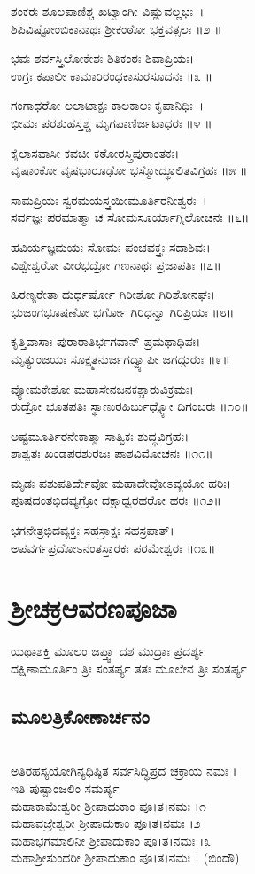 ಶಂಕರಃ ಶೂಲಪಾಣಿಶ್ಚ ಖಟ್ವಾಂಗೀ ವಿಷ್ಣುವಲ್ಲಭಃ~।\\
ಶಿಪಿವಿಷ್ಟೋಂಬಿಕಾನಾಥಃ ಶ್ರೀಕಂಠೋ ಭಕ್ತವತ್ಸಲಃ ॥೨ ॥

ಭವಃ ಶರ್ವಸ್ತ್ರಿಲೋಕೇಶಃ ಶಿತಿಕಂಠಃ ಶಿವಾಪ್ರಿಯಃ।\\
ಉಗ್ರಃ ಕಪಾಲೀ ಕಾಮಾರಿರಂಧಕಾಸುರಸೂದನಃ ॥೩ ॥

ಗಂಗಾಧರೋ ಲಲಾಟಾಕ್ಷಃ ಕಾಲಕಾಲಃ ಕೃಪಾನಿಧಿಃ~।\\
ಭೀಮಃ ಪರಶುಹಸ್ತಶ್ಚ ಮೃಗಪಾಣಿರ್ಜಟಾಧರಃ ॥೪ ॥

ಕೈಲಾಸವಾಸೀ ಕವಚೀ ಕಠೋರಸ್ತ್ರಿಪುರಾಂತಕಃ।\\
ವೃಷಾಂಕೋ ವೃಷಭಾರೂಢೋ ಭಸ್ಮೋದ್ಧೂಲಿತವಿಗ್ರಹಃ ॥೫ ॥

ಸಾಮಪ್ರಿಯಃ ಸ್ವರಮಯಸ್ತ್ರಯೀಮೂರ್ತಿರನೀಶ್ವರಃ~।\\
ಸರ್ವಜ್ಞಃ ಪರಮಾತ್ಮಾ ಚ ಸೋಮಸೂರ್ಯಾಗ್ನಿಲೋಚನಃ ॥೬॥

ಹವಿರ್ಯಜ್ಞಮಯಃ ಸೋಮಃ ಪಂಚವಕ್ತ್ರಃ ಸದಾಶಿವಃ।\\
ವಿಶ್ವೇಶ್ವರೋ ವೀರಭದ್ರೋ ಗಣನಾಥಃ ಪ್ರಜಾಪತಿಃ ॥೭॥

ಹಿರಣ್ಯರೇತಾ ದುರ್ಧರ್ಷೋ ಗಿರೀಶೋ ಗಿರಿಶೋನಘಃ।\\
ಭುಜಂಗಭೂಷಣೋ ಭರ್ಗೋ ಗಿರಿಧನ್ವಾ ಗಿರಿಪ್ರಿಯಃ ॥೮॥

ಕೃತ್ತಿವಾಸಾಃ ಪುರಾರಾತಿರ್ಭಗವಾನ್ ಪ್ರಮಥಾಧಿಪಃ।\\
ಮೃತ್ಯುಂಜಯಃ ಸೂಕ್ಷ್ಮತನುರ್ಜಗದ್ವ್ಯಾಪೀ ಜಗದ್ಗುರುಃ ॥೯॥

ವ್ಯೋಮಕೇಶೋ ಮಹಾಸೇನಜನಕಶ್ಚಾರುವಿಕ್ರಮಃ।\\
ರುದ್ರೋ ಭೂತಪತಿಃ ಸ್ಥಾಣುರಹಿರ್ಬುಧ್ನ್ಯೋ ದಿಗಂಬರಃ ॥೧೦॥

ಅಷ್ಟಮೂರ್ತಿರನೇಕಾತ್ಮಾ ಸಾತ್ವಿಕಃ ಶುದ್ಧವಿಗ್ರಹಃ।\\
ಶಾಶ್ವತಃ ಖಂಡಪರಶುರಜಃ ಪಾಶವಿಮೋಚನಃ ॥೧೧॥

ಮೃಡಃ ಪಶುಪತಿರ್ದೇವೋ ಮಹಾದೇವೋಽವ್ಯಯೋ ಹರಿಃ।\\
ಪೂಷದಂತಭಿದವ್ಯಗ್ರೋ ದಕ್ಷಾಧ್ವರಹರೋ ಹರಃ ॥೧೨॥

ಭಗನೇತ್ರಭಿದವ್ಯಕ್ತಃ ಸಹಸ್ರಾಕ್ಷಃ ಸಹಸ್ರಪಾತ್।\\
ಅಪವರ್ಗಪ್ರದೋಽನಂತಸ್ತಾರಕಃ ಪರಮೇಶ್ವರಃ ॥೧೩॥

\section{ಶ್ರೀಚಕ್ರಆವರಣಪೂಜಾ}
ಯಥಾಶಕ್ತಿ ಮೂಲಂ ಜಪ್ತ್ವಾ ದಶ ಮುದ್ರಾಃ ಪ್ರದರ್ಶ್ಯ\\
ದಕ್ಷಿಣಾಮೂರ್ತಿಂ ತ್ರಿಃ ಸಂತರ್ಪ್ಯ ತತಃ ಮೂಲೇನ ತ್ರಿಃ ಸಂತರ್ಪ್ಯ
\subsection{ಮೂಲತ್ರಿಕೋಣಾರ್ಚನಂ}
 \\ಅತಿರಹಸ್ಯಯೋಗಿನ್ಯಧಿಷ್ಠಿತ ಸರ್ವಸಿದ್ಧಿಪ್ರದ ಚಕ್ರಾಯ ನಮಃ ।\\ಇತಿ ಪುಷ್ಪಾಂಜಲಿಂ ಸಮರ್ಪ್ಯ\\
 ಮಹಾಕಾಮೇಶ್ವರೀ ಶ್ರೀಪಾದುಕಾಂ ಪೂ।ತ।ನಮಃ ।೧\\
 ಮಹಾವಜ್ರೇಶ್ವರೀ ಶ್ರೀಪಾದುಕಾಂ ಪೂ।ತ।ನಮಃ ।೨\\
 ಮಹಾಭಗಮಾಲಿನೀ ಶ್ರೀಪಾದುಕಾಂ ಪೂ।ತ।ನಮಃ ।೩\\
 ಮಹಾಶ್ರೀಸುಂದರೀ ಶ್ರೀಪಾದುಕಾಂ ಪೂ।ತ।ನಮಃ । (ಬಿಂದೌ)
